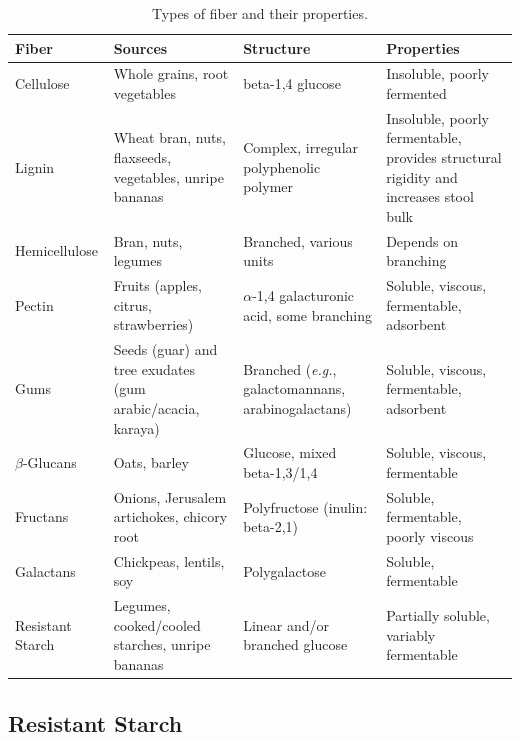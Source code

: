 \documentclass{tufte-handout}
\begin{document}
\begin{table}[t]
\caption{Types of fiber and their properties.}\label{tab:fiber-types}
\begin{tabular}{p{2cm}p{3cm}p{2cm}p{3cm}}
\toprule
\textbf{Fiber} & \textbf{Sources} & \textbf{Structure} & \textbf{Properties} \\ \midrule
Cellulose & Whole grains, root vegetables & beta-1,4 glucose & Insoluble, poorly fermented \\
Lignin & Wheat bran, nuts, flaxseeds, vegetables, unripe bananas & Complex, irregular polyphenolic polymer & Insoluble, poorly fermentable, provides structural rigidity and increases stool bulk \\
Hemicellulose & Bran, nuts, legumes & Branched, various units & Depends on branching \\
Pectin & Fruits (apples, citrus, strawberries) & $\alpha$-1,4 galacturonic acid, some branching & Soluble, viscous, fermentable, adsorbent \\
Gums & Seeds (guar) and tree exudates (gum arabic/acacia, karaya) & Branched (\textit{e.g.}, galactomannans, arabinogalactans) & Soluble, viscous, fermentable, adsorbent \\
$\beta$-Glucans & Oats, barley & Glucose, mixed beta-1,3/1,4 & Soluble, viscous, fermentable \\
Fructans & Onions, Jerusalem artichokes, chicory root & Polyfructose (inulin: beta-2,1) & Soluble, fermentable, poorly viscous \\ 
Galactans & Chickpeas, lentils, soy & Polygalactose & Soluble, fermentable \\ 
Resistant Starch & Legumes, cooked/cooled starches, unripe bananas & Linear and/or branched glucose & Partially soluble, variably fermentable \\ \bottomrule
\end{tabular}
\end{table}

\subsection{Resistant Starch}
\end{document}
